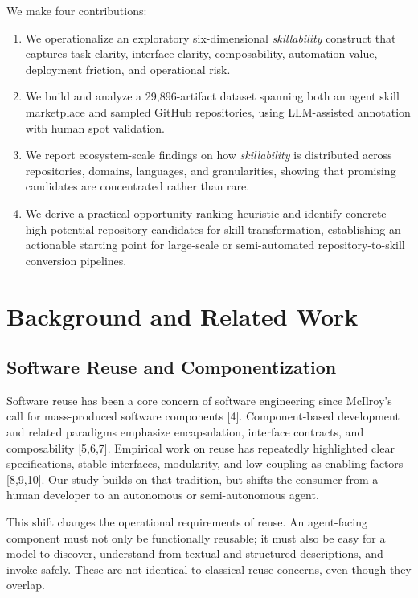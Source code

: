 \documentclass[sigconf,review,anonymous,nonacm]{acmart}
\newcommand{\skillability}{\textit{skillability}\xspace}
\begin{document}
We make four contributions:
\begin{enumerate}[leftmargin=*,itemsep=2pt]
    \item We operationalize an exploratory six-dimensional \skillability construct that captures task clarity, interface clarity, composability, automation value, deployment friction, and operational risk.
    \item We build and analyze a 29,896-artifact dataset spanning both an agent skill marketplace and sampled GitHub repositories, using LLM-assisted annotation with human spot validation.
    \item We report ecosystem-scale findings on how \skillability is distributed across repositories, domains, languages, and granularities, showing that promising candidates are concentrated rather than rare.
    \item We derive a practical opportunity-ranking heuristic and identify concrete high-potential repository candidates for skill transformation, establishing an actionable starting point for large-scale or semi-automated repository-to-skill conversion pipelines.
\end{enumerate}

\section{Background and Related Work}

\subsection{Software Reuse and Componentization}

Software reuse has been a core concern of software engineering since McIlroy's call for mass-produced software components [4]. Component-based development and related paradigms emphasize encapsulation, interface contracts, and composability [5,6,7]. Empirical work on reuse has repeatedly highlighted clear specifications, stable interfaces, modularity, and low coupling as enabling factors [8,9,10]. Our study builds on that tradition, but shifts the consumer from a human developer to an autonomous or semi-autonomous agent.

This shift changes the operational requirements of reuse. An agent-facing component must not only be functionally reusable; it must also be easy for a model to discover, understand from textual and structured descriptions, and invoke safely. These are not identical to classical reuse concerns, even though they overlap.
\end{document}
